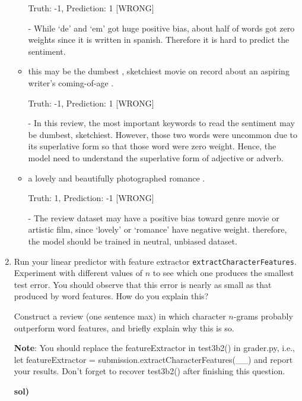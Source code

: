 \documentclass[a4paper]{article}
\begin{document}
\begin{enumerate}[label=\alph*.]
\begin{itemize}
            Truth: -1, Prediction: 1 [WRONG]

            - While `de' and `em' got huge positive bias, about half of words got zero weights since it is written in spanish. 
            Therefore it is hard to predict the sentiment. 

            \item this may be the dumbest , sketchiest movie on record about an aspiring writer's coming-of-age .

            Truth: -1, Prediction: 1 [WRONG]

            - In this review, the most important keywords to read the sentiment may be dumbest, sketchiest.
            However, those two words were uncommon due to its superlative form so that those word were zero weight. 
            Hence, the model need to understand the superlative form of adjective or adverb.

            \item a lovely and beautifully photographed romance .
            
            Truth: 1, Prediction: -1 [WRONG]

            - The review dataset may have a positive bias toward genre movie or artistic film, since `lovely' or `romance' have negative weight.
            therefore, the model should be trained in neutral, unbiased dataset.

        \end{itemize}



        \setcounter{enumi}{5}
        \item Run your linear predictor with feature extractor \texttt{extractCharacterFeatures}.  Experiment
        with different values of $n$ to see which one produces the smallest test error.  You should observe that this error is
        nearly as small as that produced by word features.  How do you explain this?

        Construct a review (one sentence max) in which character $n$-grams
        probably outperform word features, and briefly explain why this is so.

        \textbf{Note}: You should replace the featureExtractor in test3b2() in grader.py, 
        i.e., let featureExtractor = submission.extractCharacterFeatures(\_\_) and report your results. 
        Don't forget to recover test3b2() after finishing this question. 

        \medskip \textbf{sol)}
        

\end{enumerate}
\end{document}

